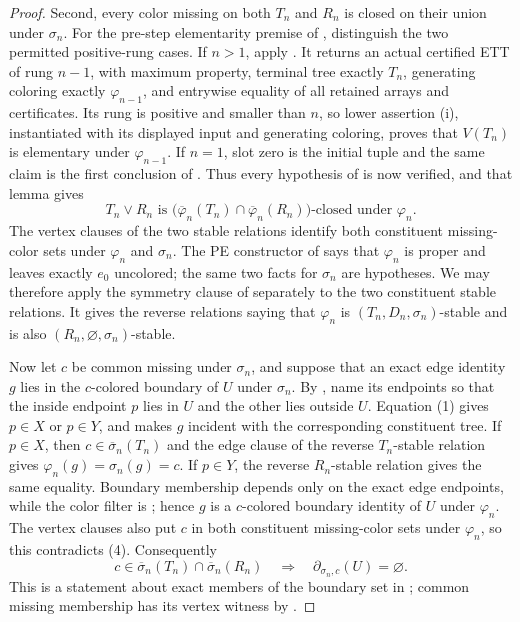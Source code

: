 \begin{proof}
Second, every color missing on both $T_n$ and $R_n$ is closed on
their union under $\sigma_n$.  For the pre-step elementarity premise of
, distinguish the two permitted
positive-rung cases.  If $n>1$, apply
.  It returns an actual certified ETT
of rung $n-1$, with maximum property, terminal tree exactly $T_n$,
generating coloring exactly $\varphi_{n-1}$, and entrywise equality of
all retained arrays and certificates.  Its rung is positive and smaller
than $n$, so lower assertion (i), instantiated with its displayed input
and generating coloring, proves that $V(T_n)$ is elementary under
$\varphi_{n-1}$.  If $n=1$, slot zero is the initial tuple and the same
claim is the first conclusion of .
Thus every hypothesis of  is now
verified, and that lemma gives
\[
 T_n\vee R_n\text{ is }
 \bigl(\overline\varphi_n(T_n)\cap
       \overline\varphi_n(R_n)\bigr)\text{-closed under }\varphi_n.
                                                               \tag{4}
\]
The vertex clauses of the two stable relations identify both constituent
missing-color sets under $\varphi_n$ and $\sigma_n$.  The PE constructor
of  says that $\varphi_n$ is proper and
leaves exactly $e_0$ uncolored; the same two facts for $\sigma_n$ are
hypotheses.  We may therefore apply the symmetry clause of 
separately to the two constituent stable relations.  It gives the reverse
relations saying that $\varphi_n$ is $(T_n,D_n,\sigma_n)$-stable and is
also $(R_n,\varnothing,\sigma_n)$-stable.

Now let $c$ be common missing under $\sigma_n$, and suppose that an exact
edge identity $g$ lies in the $c$-colored boundary of $U$ under
$\sigma_n$.  By , name its endpoints so that the
inside endpoint $p$ lies in $U$ and the other lies outside $U$.  Equation
(1) gives $p\in X$ or $p\in Y$, and  makes $g$
incident with the corresponding constituent tree.  If $p\in X$, then
$c\in\overline\sigma_n(T_n)$ and the edge clause of the reverse
$T_n$-stable relation gives $\varphi_n(g)=\sigma_n(g)=c$.  If $p\in Y$,
the reverse $R_n$-stable relation gives the same equality.  Boundary
membership depends only on the exact edge endpoints, while the color
filter is ; hence $g$ is a $c$-colored
boundary identity of $U$ under $\varphi_n$.  The vertex clauses also put
$c$ in both constituent missing-color sets under $\varphi_n$, so this
contradicts (4).  Consequently
\[
 c\in\overline\sigma_n(T_n)\cap\overline\sigma_n(R_n)
 \quad\Longrightarrow\quad
 \partial_{\sigma_n,c}(U)=\varnothing.                       \tag{5}
\]
This is a statement about exact members of the boundary set in
; common missing membership has its vertex
witness by .
\end{proof}
